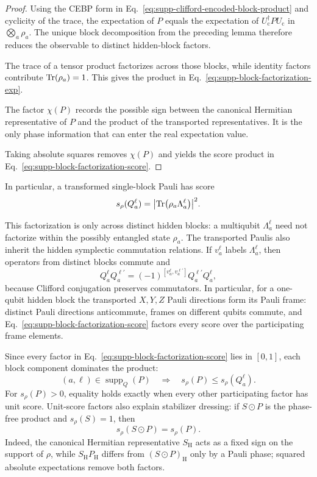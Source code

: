 \documentclass[
  aps,
  prx,
  reprint,
  superscriptaddress,
  amsmath,
  amssymb,
  nofootinbib,
  longbibliography
]{revtex4-2}
\newcommand{\supp}{\operatorname{supp}}
\begin{document}
\begin{proof}
Using the CEBP form in
Eq.~\eqref{eq:supp-clifford-encoded-block-product} and cyclicity of the
trace, the expectation of $P$ equals the expectation of
$U_{\mathrm c}^\dagger P U_{\mathrm c}$ in
$\bigotimes_a\rho_a$.  The unique block decomposition from the preceding
lemma therefore reduces the observable to distinct hidden-block factors.

The trace of a tensor product factorizes across those blocks, while identity
factors contribute $\Tr(\rho_a)=1$.  This gives the product in
Eq.~\eqref{eq:supp-block-factorization-exp}.

The factor $\chi(P)$ records the possible sign between the canonical
Hermitian representative of $P$ and the product of the transported
representatives.  It is the only phase information that can enter the real
expectation value.

Taking absolute squares removes $\chi(P)$ and yields the score product in
Eq.~\eqref{eq:supp-block-factorization-score}.
\end{proof}

In particular, a transformed single-block Pauli has score
\begin{equation}
s_\rho(Q_a^\ell)
=
\bigl|\Tr(\rho_a\Lambda_a^\ell)\bigr|^2.
\label{eq:supp-single-block-score}
\end{equation}

This factorization is only across distinct hidden blocks: a multiqubit
$\Lambda_a^\ell$ need not factorize within the possibly entangled state
$\rho_a$.  The transported Paulis also inherit the hidden symplectic
commutation relations.  If $v_a^\ell$ labels $\Lambda_a^\ell$, then operators
from distinct blocks commute and
\begin{equation}
Q_a^\ell Q_a^{\ell'}
=
(-1)^{[v_a^\ell,v_a^{\ell'}]}
Q_a^{\ell'}Q_a^\ell,
\end{equation}
because Clifford conjugation preserves commutators.  In particular, for a
one-qubit hidden block the transported $X,Y,Z$ Pauli directions form its Pauli frame:
distinct Pauli directions anticommute, frames on different qubits commute, and
Eq.~\eqref{eq:supp-block-factorization-score} factors every score over the
participating frame elements.

Since every factor in Eq.~\eqref{eq:supp-block-factorization-score} lies in
$[0,1]$, each block component dominates the product:
\begin{equation}
(a,\ell)\in\supp_Q(P)
\quad\Longrightarrow\quad
s_\rho(P)\le s_\rho(Q_a^\ell).
\end{equation}
For $s_\rho(P)>0$, equality holds exactly when every other participating
factor has unit score.  Unit-score factors also explain stabilizer dressing:
if $S\odot P$ is the phase-free product and $s_\rho(S)=1$, then
\begin{equation}
s_\rho(S\odot P)=s_\rho(P).
\end{equation}
Indeed, the canonical Hermitian representative $S_{\mathrm H}$ acts as a
fixed sign on the support of $\rho$, while
$S_{\mathrm H}P_{\mathrm H}$ differs from $(S\odot P)_{\mathrm H}$ only by a
Pauli phase; squared absolute expectations remove both factors.
\end{document}
